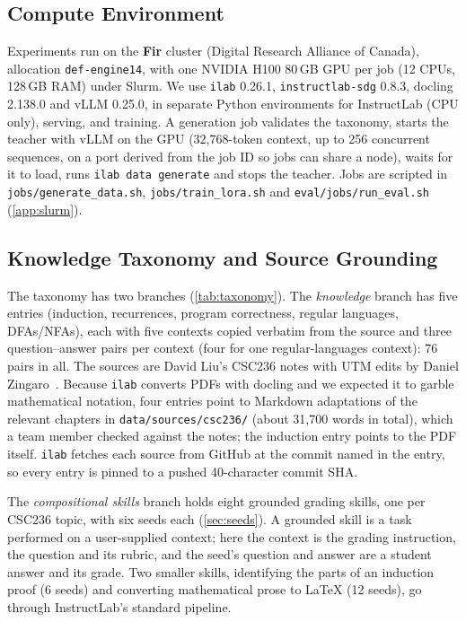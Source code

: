\documentclass[11pt,a4paper]{article}
\newif\ifdraft
\newcommand{\todo}[2]{%
  \ifdraft\textcolor{red}{\textbf{[TODO #1:} #2\textbf{]}}\fi}
\newcommand{\file}[1]{\nolinkurl{#1}}
\theoremstyle{definition}
\begin{document}
\subsection{Compute Environment}
Experiments run on the \textbf{Fir} cluster (Digital Research Alliance of Canada), allocation \file{def-engine14}, with one NVIDIA H100 80\,GB GPU per job (12 CPUs, 128\,GB RAM) under Slurm. We use \file{ilab} 0.26.1, \file{instructlab-sdg} 0.8.3, docling 2.138.0 and vLLM 0.25.0, in separate Python environments for InstructLab (CPU only), serving, and training. A generation job validates the taxonomy, starts the teacher with vLLM on the GPU (32,768-token context, up to 256 concurrent sequences, on a port derived from the job ID so jobs can share a node), waits for it to load, runs \texttt{ilab data generate} and stops the teacher. Jobs are scripted in \file{jobs/generate_data.sh}, \file{jobs/train_lora.sh} and \file{eval/jobs/run_eval.sh} (\cref{app:slurm}).

\subsection{Knowledge Taxonomy and Source Grounding}\label{sec:taxonomy}
The taxonomy has two branches (\cref{tab:taxonomy}). The \emph{knowledge} branch has five entries (induction, recurrences, program correctness, regular languages, DFAs/NFAs), each with five contexts copied verbatim from the source and three question--answer pairs per context (four for one regular-languages context): 76 pairs in all. The sources are David Liu's CSC236 notes with UTM edits by Daniel Zingaro~\cite{liu_notes}. Because \texttt{ilab} converts PDFs with docling and we expected it to garble mathematical notation, four entries point to Markdown adaptations of the relevant chapters in \file{data/sources/csc236/} (about 31,700 words in total), which a team member checked against the notes; the induction entry points to the PDF itself. \texttt{ilab} fetches each source from GitHub at the commit named in the entry, so every entry is pinned to a pushed 40-character commit SHA.

The \emph{compositional skills} branch holds eight grounded grading skills, one per CSC236 topic, with six seeds each (\cref{sec:seeds}). A grounded skill is a task performed on a user-supplied context; here the context is the grading instruction, the question and its rubric, and the seed's question and answer are a student answer and its grade. Two smaller skills, identifying the parts of an induction proof (6 seeds) and converting mathematical prose to \LaTeX{} (12 seeds), go through InstructLab's standard pipeline.
\todo{}{Licensing: the \texttt{attribution.txt} of the induction knowledge entry is still the template, and the others record no licence. Record the permission to use the course notes before submission (see \cref{sec:ethics}).}
\end{document}
